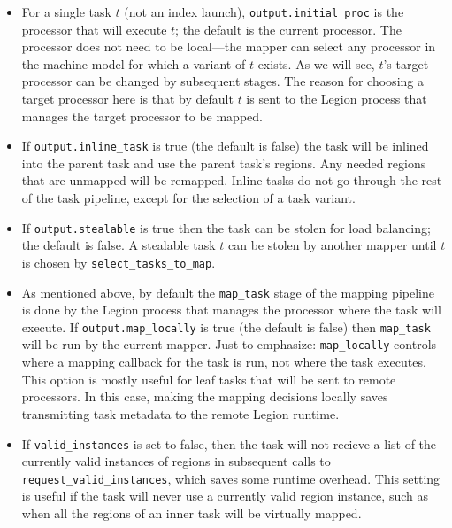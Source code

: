 \begin{itemize}
\item For a single task $t$ (not an index launch), {\tt output.initial\_proc} is the processor that will execute $t$; the default is the current processor.
  The processor does not need to be local---the mapper can select any processor in the machine model for which a variant of $t$ exists.  As we will see, $t$'s target processor can be changed by subsequent stages.  The reason for choosing a target processor
  here is that by default $t$ is sent to the Legion process that manages the target processor to be mapped.

\item If {\tt output.inline\_task} is true (the default is false) the task will be inlined into the parent task and use the parent task's regions.  Any needed regions that are unmapped will be remapped.  Inline tasks do not go through the rest of the task pipeline, except for the selection of
  a task variant.  

\item   If {\tt output.stealable} is true then the task can be stolen for load balancing; the default is false.  A stealable task $t$ can be stolen by another mapper until $t$ is chosen by {\tt select\_tasks\_to\_map}.

\item As mentioned above, by default the {\tt map\_task} stage of the mapping pipeline is done by the Legion process that manages the processor where the task will execute.  If {\tt output.map\_locally} is true (the default is false) then {\tt map\_task} will be run by the current mapper.
  Just to emphasize: {\tt map\_locally} controls where a mapping callback for the task is run, not where the task executes.  This option is mostly useful for leaf tasks that will be sent to remote processors.  In this case, making the  mapping decisions locally saves transmitting
  task metadata to the remote Legion runtime.

\item If {\tt valid\_instances} is set to false, then the task will not recieve a list of the currently valid instances of regions in subsequent calls to {\tt request\_valid\_instances}, which saves some runtime overhead.  This setting is useful if the task will never use
  a currently valid region instance, such as when all the regions of an inner task will be virtually mapped.


\end{itemize}
